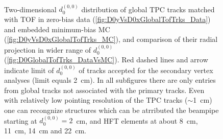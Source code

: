 \begin{figure}[b!]
\parbox{0.4725\textwidth}{
  \centering
  \begin{subfigure}[b]{\linewidth}\addtocounter{subfigure}{-2}
  \end{subfigure}\\
  \begin{minipage}[t][1.042\linewidth][t]{\linewidth}\vspace{10pt}
    \caption[Comparison of $d_{0}^{(0,0)}$ distribution of global TPC tracks matched with TOF in zero-bias data and embedded MC (minimum-bias).]{Two-dimensional $d_{0}^{(0,0)}$ distribution of global TPC tracks matched with TOF in zero-bias data (\ref{fig:D0yVsD0xGlobalTofTrks_Data}) and embedded minimum-bias MC (\ref{fig:D0yVsD0xGlobalTofTrks_MC}), and comparison of their radial projection in wider range of $d_{0}^{(0,0)}$ (\ref{fig:D0GlobalTofTrks_DataVsMC}). Red dashed lines and arrow indicate limit of $d_{0}^{(0,0)}$ of tracks accepted for the secondary vertex analyses (limit equals 2~cm). In all subfigures there are only entries from global tracks not associated with the primary tracks. Even with relatively low pointing resolution of the TPC tracks ($\sim$1~cm) one can recongnize structures which can be atrributed the beampipe starting at $d_{0}^{(0,0)}=2$~cm, and HFT elements at about 8~cm, 11~cm, 14~cm and 22~cm.}\label{fig:deadMatDataVsMC2}
  \end{minipage}
}\vspace{-30pt}%
\end{figure}

